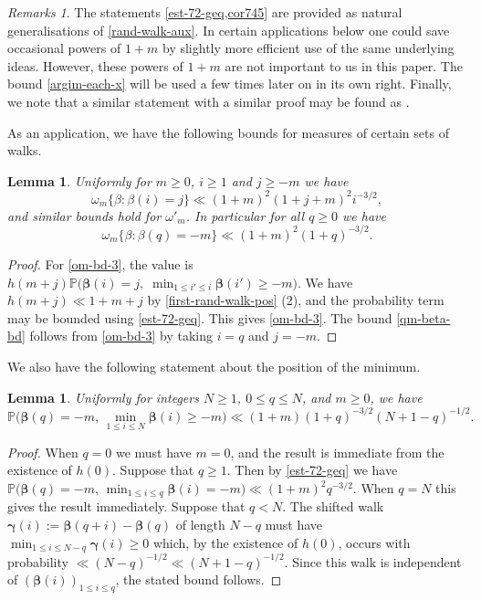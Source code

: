 \documentclass[11pt,reqno]{amsart}
\numberwithin{equation}{section}
\newtheorem{lemma}[theorem]{Lemma}
\theoremstyle{definition}
\theoremstyle{remark}
\newtheorem*{remarks}{Remarks}
\newcommand{\mb}{\mathbb}
\def\boldbeta{\boldsymbol\beta}
\def\boldgamma{\boldsymbol\gamma}
\renewcommand{\le}{\leqslant}
\renewcommand{\ge}{\geqslant}
\begin{document}
\begin{remarks}
The statements \cref{est-72-geq,cor745} are provided as natural generalisations of \cref{rand-walk-aux}. In certain applications below one could save occasional powers of $1 + m$ by slightly more efficient use of the same underlying ideas. However, these powers of $1 + m$ are not important to us in this paper.  The bound \cref{argim-each-x} will be used a few times later on in its own right. Finally, we note that a similar statement with a similar proof may be found as \cite[Theorem 2]{ford-prob}.
\end{remarks}

As an application, we have the following bounds for measures of certain sets of walks.

\begin{lemma}\label{argmin-omega-lem}
Uniformly for $m \ge 0$, $i \ge 1$ and $j \ge -m$ we have
\begin{equation}\label{om-bd-3} \omega_m \{\beta \colon \beta(i) = j\} \ll (1 + m)^2(1 + j + m)^2 i^{-3/2},\end{equation} and similar bounds hold for $\omega'_m$.
In particular for all $q \ge 0$ we have
\begin{equation}\label{qm-beta-bd}  \omega_m \{ \beta \colon\beta(q) = -m \} \ll (1 + m)^2 (1 + q)^{-3/2}.\end{equation} 
\end{lemma}
\begin{proof}
For \cref{om-bd-3}, the value is $h(m + j) \mb{P}\big( \boldbeta(i) = j,\; \min_{1 \le i' \le i} \boldbeta(i') \ge -m)$.
We have $h(m + j) \ll 1 + m + j$ by \cref{first-rand-walk-pos} (2), and the probability term may be bounded using \cref{est-72-geq}. This gives \cref{om-bd-3}. The bound \cref{qm-beta-bd} follows from \cref{om-bd-3} by taking $i = q$ and $j = -m$. 
\end{proof}

We also have the following statement about the position of the minimum.

\begin{lemma}\label{min-pos-lem}
Uniformly for integers $N \ge 1$, $0 \le q \le N$, and $m \ge 0$, we have
\[ \mb{P}\big( \boldbeta(q) = -m, \, \min_{1 \le i \le N} \boldbeta(i) \ge -m\big) \ll (1 + m)(1 +  q)^{-3/2}(N + 1 - q)^{-1/2}. \]
\end{lemma}
\begin{proof}
When $q = 0$ we must have $m = 0$, and the result is immediate from the existence of $h(0)$. Suppose that $q \ge 1$. Then by \cref{est-72-geq} we have $\mb{P}\big( \boldbeta(q) = -m, \, \min_{1 \le i \le q} \boldbeta(i) = -m\big) \ll (1 + m)^2 q^{-3/2}$. When $q = N$ this gives the result immediately. Suppose that $q < N$. The shifted walk $\boldgamma(i) := \boldbeta(q + i) - \boldbeta(q)$ of length $N - q$ must have $\min_{1 \le i \le N - q} \boldgamma(i) \ge 0$ which, by the existence of $h(0)$, occurs with probability $\ll (N - q)^{-1/2} \ll (N + 1 - q)^{-1/2}$. Since this walk is independent of $(\boldbeta(i))_{1 \le i \le q}$, the stated bound follows.
  \end{proof}
\end{document}
